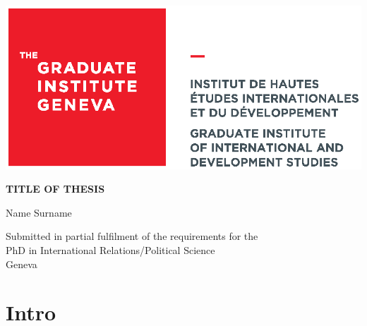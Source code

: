 \documentclass{iheid}
\begin{document}
\hspace*{-1.25cm}
\includegraphics[width=0.4\linewidth]{Logo_CMYK_Hi.eps}

{\centering \sffamily
\vspace{3cm}
{\Large\textbf{TITLE OF THESIS}}

\vspace{3cm}
Name Surname

\vspace{8cm}
Submitted in partial fulfilment of the requirements for the\\
	PhD in International Relations/Political Science\\

\vspace{1cm}Geneva

\vspace{1cm}\the\year

}

\newpage
{}
\justifying

\section{Intro}
\end{document}
